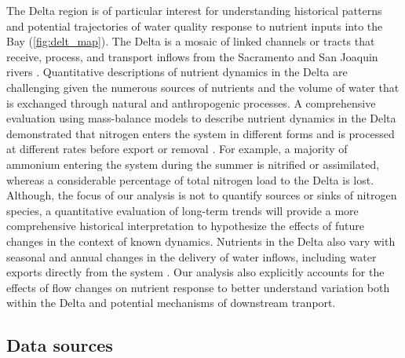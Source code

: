 \documentclass[journal = esthag, manuscript = article]{achemso}\usepackage[]{graphicx}\usepackage[]{color}
\begin{document}
The Delta region is of particular interest for understanding historical patterns and potential trajectories of water quality response to nutrient inputs into the Bay (\cref{fig:delt_map}).  The Delta is a mosaic of linked channels or tracts that receive, process, and transport inflows from the Sacramento and San Joaquin rivers \cite{Jassby00,Jassby08,Novick15}.  Quantitative descriptions of nutrient dynamics in the Delta are challenging given the numerous sources of nutrients and the volume of water that is exchanged through natural and anthropogenic processes.  A comprehensive evaluation using mass-balance models to describe nutrient dynamics in the Delta demonstrated that nitrogen enters the system in different forms and is processed at different rates before export or removal \cite{Novick15}. For example, a majority of ammonium entering the system during the summer is nitrified or assimilated, whereas a considerable percentage of total nitrogen load to the Delta is lost.  Although, the focus of our analysis is not to quantify sources or sinks of nitrogen species, a quantitative evaluation of long-term trends will provide a more comprehensive historical interpretation to hypothesize the effects of future changes in the context of known dynamics.  Nutrients in the Delta also vary with seasonal and annual changes in the delivery of water inflows, including water exports directly from the system \cite{Jassby00,Jassby08}.  Our analysis also explicitly accounts for the effects of flow changes on nutrient response to better understand variation both within the Delta and potential mechanisms of downstream tranport. 

\subsection{Data sources}
\end{document}
